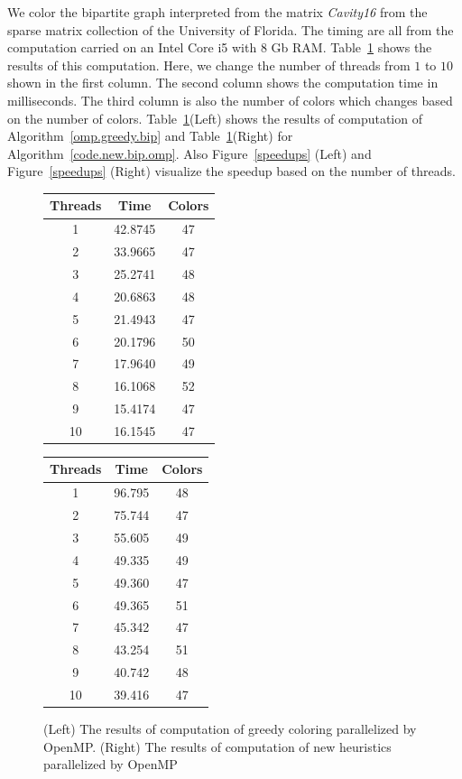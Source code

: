 \documentclass[12pt, twoside,a4paper,toc=bibliography]{scrbook}
\newcommand{\figref}[1]{Figure~\protect\ref{#1}}
\newcommand{\coderef}[1]{Algorithm~\protect\ref{#1}}
\begin{document}
We color the bipartite graph interpreted from the matrix \textit{Cavity16}
from the sparse matrix collection of the University of Florida.
The timing are all from the computation carried on an Intel Core i5 with 8 Gb RAM.
Table~\ref{omp.res} shows the results of this computation.
Here, we change the number of threads from $1$ to $10$ shown in the first column.
The second column shows the computation time in milliseconds. The third column
is also the number of colors which changes based on the number of colors.
Table~\ref{omp.res}(Left) shows the results of computation of \coderef{omp.greedy.bip}
and Table~\ref{omp.res}(Right) for \coderef{code.new.bip.omp}.
Also \figref{speedups} (Left) and \figref{speedups} (Right) visualize the speedup
based on the number of threads.
\begin{figure}
\begin{tabular}{|c|c|c|}
\hline
Threads & Time & Colors \\\hline
1 & 42.8745 & 47 \\\hline
2 & 33.9665 & 47 \\\hline
3 & 25.2741 & 48 \\\hline
4 & 20.6863 & 48 \\\hline
5 & 21.4943 & 47 \\\hline
6 & 20.1796 & 50 \\\hline
7 & 17.9640 & 49 \\\hline
8 & 16.1068 & 52 \\\hline
9 & 15.4174 & 47 \\\hline
10 & 16.1545 & 47 \\\hline
\end{tabular}\hfill
\begin{tabular}{|c|c|c|}
\hline
Threads & Time & Colors \\\hline
1 & 96.795 & 48 \\\hline
2 & 75.744 & 47 \\\hline
3 & 55.605 & 49 \\\hline
4 & 49.335 & 49 \\\hline
5 & 49.360 & 47 \\\hline
6 & 49.365 & 51 \\\hline
7 & 45.342 & 47 \\\hline
8 & 43.254 & 51 \\\hline
9 & 40.742 & 48 \\\hline
10 & 39.416 & 47 \\\hline
\end{tabular}
\caption{
(Left) The results of computation of greedy coloring parallelized by OpenMP.
(Right) The results of computation of new heuristics parallelized by OpenMP}
\label{omp.res}
\end{figure}
\end{document}
